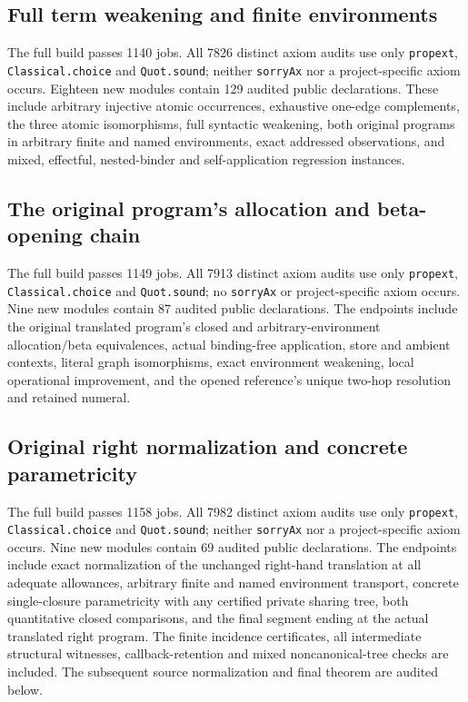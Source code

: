 \subsection{Full term weakening and finite environments}
{\raggedright
The full build passes 1140 jobs. All 7826 distinct axiom audits use only
\texttt{propext}, \texttt{Classical.choice} and \texttt{Quot.sound}; neither
\texttt{sorryAx} nor a project-specific axiom occurs. Eighteen new modules
contain 129 audited public declarations. These include arbitrary injective
atomic occurrences, exhaustive one-edge complements, the three atomic
isomorphisms, full syntactic weakening, both original programs in arbitrary
finite and named environments, exact addressed observations, and mixed,
effectful, nested-binder and self-application regression instances.\par}


\subsection{The original program's allocation and beta-opening chain}
{\raggedright
The full build passes 1149 jobs. All 7913 distinct axiom audits use only
\texttt{propext}, \texttt{Classical.choice} and \texttt{Quot.sound}; no
\texttt{sorryAx} or project-specific axiom occurs. Nine new modules contain
87 audited public declarations. The endpoints include the original translated
program's closed and arbitrary-environment allocation/beta equivalences,
actual binding-free application, store and ambient contexts, literal graph
isomorphisms, exact environment weakening, local operational improvement,
and the opened reference's unique two-hop resolution and retained numeral.\par}


\subsection{Original right normalization and concrete parametricity}
{\raggedright
The full build passes 1158 jobs. All 7982 distinct axiom audits use only
\texttt{propext}, \texttt{Classical.choice} and \texttt{Quot.sound}; neither
\texttt{sorryAx} nor a project-specific axiom occurs. Nine new modules contain
69 audited public declarations. The endpoints include exact normalization
of the unchanged right-hand translation at all adequate allowances,
arbitrary finite and named environment transport, concrete single-closure
parametricity with any certified private sharing tree, both quantitative
closed comparisons, and the final segment ending at the actual translated
right program. The finite incidence certificates, all intermediate structural
witnesses, callback-retention and mixed noncanonical-tree checks are included.
The subsequent source normalization and final theorem are audited below.\par}

